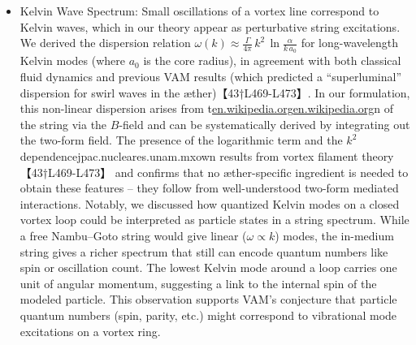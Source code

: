 \documentclass[12pt]{article}
\begin{document}
{{\begin{itemize}
\item 
Kelvin Wave Spectrum: Small oscillations of a vortex line correspond to Kelvin waves, which in our theory appear as perturbative string excitations. We derived the dispersion relation $\displaystyle \omega(k) \approx \frac{\Gamma}{4\pi} \, k^2 \,\ln\!\frac{\alpha}{k\,a_0}$ for long-wavelength Kelvin modes (where $a_0$ is the core radius), in agreement with both classical fluid dynamics and previous VAM results (which predicted a “superluminal” dispersion for swirl waves in the æther)【43†L469-L473】. In our formulation, this non-linear dispersion arises from t\href{https://en.wikipedia.org/wiki/Vortex_ring#:~:text=The%20resulting%20circulation%20Image%3A%20,frac%20%7B7%7D%7B4%7D%7D%5Cright%29%5Cend%7Baligned}{en.wikipedia.org}\href{https://en.wikipedia.org/wiki/Vortex_ring#:~:text=,frac%20%7B1%7D%7B4%7D%7D%5Cright}{en.wikipedia.org}n of the string via the $B$-field and can be systematically derived by integrating out the two-form field. The presence of the logarithmic term and the $k^2$ dependencejpac.nucleares.unam.mxown results from vortex filament theory【43†L469-L473】 and confirms that no æther-specific ingredient is needed to obtain these features – they follow from well-understood two-form mediated interactions. Notably, we discussed how quantized Kelvin modes on a closed vortex loop could be interpreted as particle states in a string spectrum. While a free Nambu–Goto string would give linear ($\omega\propto k$) modes, the in-medium string gives a richer spectrum that still can encode quantum numbers like spin or oscillation count. The lowest Kelvin mode around a loop carries one unit of angular momentum, suggesting a link to the internal spin of the modeled particle. This observation supports VAM’s conjecture that particle quantum numbers (spin, parity, etc.) might correspond to vibrational mode excitations on a vortex ring.





\end{itemize}}}
\end{document}
